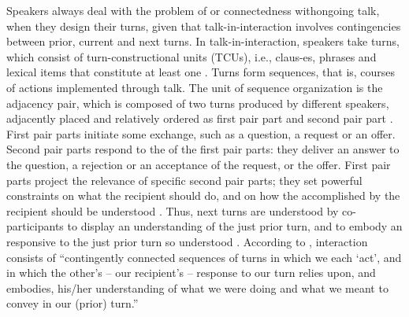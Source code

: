 \documentclass[output=paper]{LSP/langsci}
\begin{document}
Speakers always deal with the problem of  or connectedness with\linebreak ongoing talk, when they design their turns, given that talk-in-interaction involves contingencies between prior, current and next turns. In talk-in-interaction, speakers take turns, which consist of turn-constructional units (TCUs), i.e., claus-\linebreak es, phrases and lexical items that constitute at least one  \citep[][3--4]{schegloff07}. Turns form sequences, that is, courses of actions implemented through talk. The unit of sequence organization is the adjacency pair, which is composed of two turns produced by different speakers, adjacently placed and relatively ordered as first pair part and second pair part \citep[][13]{schegloff07}. First pair parts initiate some exchange, such as a question, a request or an offer. Second pair parts respond to the  of the first pair parts: they deliver an answer to the question, a rejection or an acceptance of the request, or the offer. First pair parts project the relevance of specific second pair parts; they set powerful constraints on what the recipient should do, and on how the  accomplished by the recipient should be understood \citep[][21]{schegloff07}. Thus, next turns are understood by co-participants to display an understanding of the just prior turn, and to embody an  responsive to the just prior turn so understood \citep[][15]{schegloff07}. According to \citet[][131]{drew12}, interaction consists of ``contingently connected sequences of turns in which we each `act', and in which the other’s -- our recipient’s -- response to our turn relies upon, and embodies, his/her understanding of what we were doing and what we meant to convey in our (prior) turn.'' 
\end{document}
